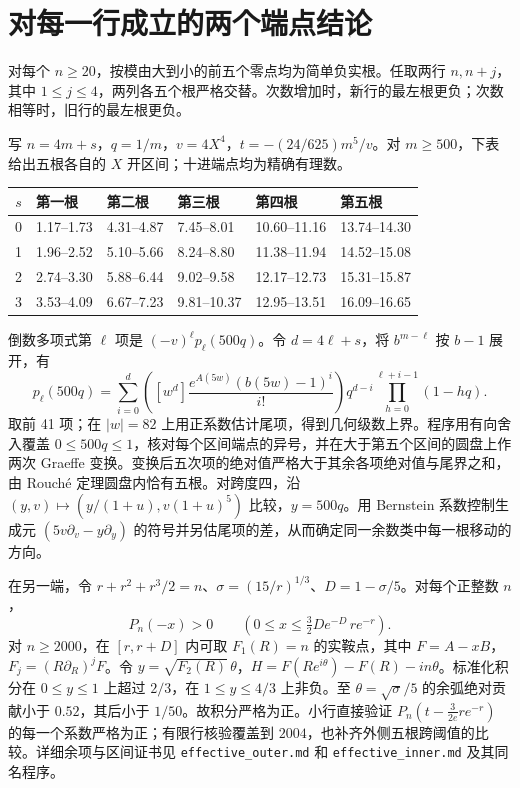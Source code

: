 \documentclass[UTF8,fontset=fandol,11pt,a4paper]{ctexart}
\begin{document}
\clearpage
\section{对每一行成立的两个端点结论}
对每个 $n\ge20$，按模由大到小的前五个零点均为简单负实根。任取两行 $n,n+j$，其中 $1\le j\le4$，两列各五个根严格交替。次数增加时，新行的最左根更负；次数相等时，旧行的最左根更负。

写 $n=4m+s$，$q=1/m$，$v=4X^4$，$t=-(24/625)m^5/v$。对 $m\ge500$，下表给出五根各自的 $X$ 开区间；十进端点均为精确有理数。
\begin{center}\small
\begin{tabular}{clllll}\toprule
$s$&第一根&第二根&第三根&第四根&第五根\\\midrule
0&1.17--1.73&4.31--4.87&7.45--8.01&10.60--11.16&13.74--14.30\\
1&1.96--2.52&5.10--5.66&8.24--8.80&11.38--11.94&14.52--15.08\\
2&2.74--3.30&5.88--6.44&9.02--9.58&12.17--12.73&15.31--15.87\\
3&3.53--4.09&6.67--7.23&9.81--10.37&12.95--13.51&16.09--16.65\\\bottomrule
\end{tabular}
\end{center}
倒数多项式第 $\ell$ 项是 $(-v)^\ell p_\ell(500q)$。令 $d=4\ell+s$，将 $b^{m-\ell}$ 按 $b-1$ 展开，有
\[
p_\ell(500q)=\sum_{i=0}^{d}\left([w^d]\frac{e^{A(5w)}(b(5w)-1)^i}{i!}\right)
q^{d-i}\prod_{h=0}^{\ell+i-1}(1-hq).
\]
取前 41 项；在 $|w|=82$ 上用正系数估计尾项，得到几何级数上界。程序用有向舍入覆盖 $0\le500q\le1$，核对每个区间端点的异号，并在大于第五个区间的圆盘上作两次 Graeffe 变换。变换后五次项的绝对值严格大于其余各项绝对值与尾界之和，由 Rouché 定理圆盘内恰有五根。对跨度四，沿 $(y,v)\mapsto(y/(1+u),v(1+u)^5)$ 比较，$y=500q$。用 Bernstein 系数控制生成元 $(5v\partial_v-y\partial_y)$ 的符号并另估尾项的差，从而确定同一余数类中每一根移动的方向。

在另一端，令 $r+r^2+r^3/2=n$、$\sigma=(15/r)^{1/3}$、$D=1-\sigma/5$。对每个正整数 $n$，
\[
 P_n(-x)>0\qquad\left(0\le x\le \tfrac32 D e^{-D}\,r e^{-r}\right).
\]
对 $n\ge2000$，在 $[r,r+D]$ 内可取 $F_1(R)=n$ 的实鞍点，其中 $F=A-xB$，$F_j=(R\partial_R)^jF$。令 $y=\sqrt{F_2(R)}\,\theta$，$H=F(R e^{i\theta})-F(R)-in\theta$。标准化积分在 $0\le y\le1$ 上超过 $2/3$，在 $1\le y\le4/3$ 上非负。至 $\theta=\sqrt{\sigma}/5$ 的余弧绝对贡献小于 $0.52$，其后小于 $1/50$。故积分严格为正。小行直接验证 $P_n(t-\tfrac{3}{2e}r e^{-r})$ 的每一个系数严格为正；有限行核验覆盖到 $2004$，也补齐外侧五根跨阈值的比较。详细余项与区间证书见 \texttt{effective\_outer.md} 和 \texttt{effective\_inner.md} 及其同名程序。
\end{document}
